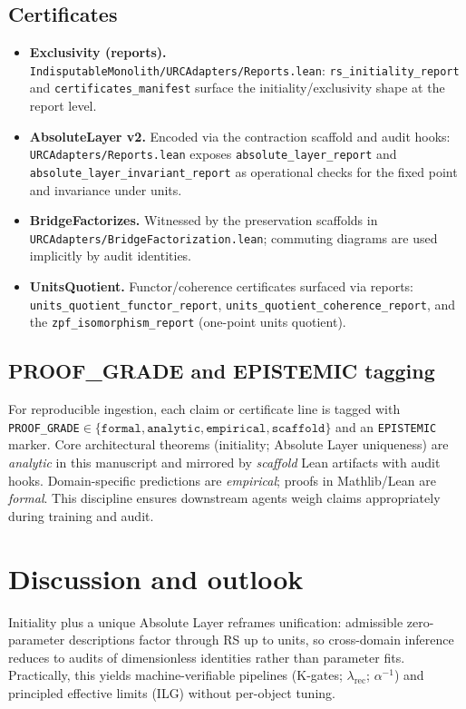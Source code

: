 \documentclass[11pt]{article}
\begin{document}
\subsection{Certificates}
\begin{itemize}
  \item \textbf{Exclusivity (reports).} \texttt{IndisputableMonolith/URCAdapters/Reports.lean}: \texttt{rs\_initiality\_report} and \texttt{certificates\_manifest} surface the initiality/exclusivity shape at the report level.
  \item \textbf{AbsoluteLayer v2.} Encoded via the contraction scaffold and audit hooks: \texttt{URCAdapters/Reports.lean} exposes \texttt{absolute\_layer\_report} and \texttt{absolute\_layer\_invariant\_report} as operational checks for the fixed point and invariance under units.
  \item \textbf{BridgeFactorizes.} Witnessed by the preservation scaffolds in \texttt{URCAdapters/BridgeFactorization.lean}; commuting diagrams are used implicitly by audit identities.
  \item \textbf{UnitsQuotient.} Functor/coherence certificates surfaced via reports: \texttt{units\_quotient\_functor\_report}, \texttt{units\_quotient\_coherence\_report}, and the \texttt{zpf\_isomorphism\_report} (one\mbox{-}point units quotient).
\end{itemize}

\subsection{PROOF\_GRADE and EPISTEMIC tagging}
For reproducible ingestion, each claim or certificate line is tagged with \texttt{PROOF\_GRADE}$\in\{\texttt{formal},\texttt{analytic},\texttt{empirical},\texttt{scaffold}\}$ and an \texttt{EPISTEMIC} marker. Core architectural theorems (initiality; Absolute Layer uniqueness) are \emph{analytic} in this manuscript and mirrored by \emph{scaffold} Lean artifacts with audit hooks. Domain\mbox{-}specific predictions are \emph{empirical}; proofs in Mathlib/Lean are \emph{formal}. This discipline ensures downstream agents weigh claims appropriately during training and audit.

\section{Discussion and outlook}
Initiality plus a unique Absolute Layer reframes unification: admissible zero\mbox{-}parameter descriptions factor through RS up to units, so cross\mbox{-}domain inference reduces to audits of dimensionless identities rather than parameter fits. Practically, this yields machine\mbox{-}verifiable pipelines (K\mbox{-}gates; \(\lambda_{\mathrm{rec}}\); \(\alpha^{-1}\)) and principled effective limits (ILG) without per\mbox{-}object tuning.
\end{document}
